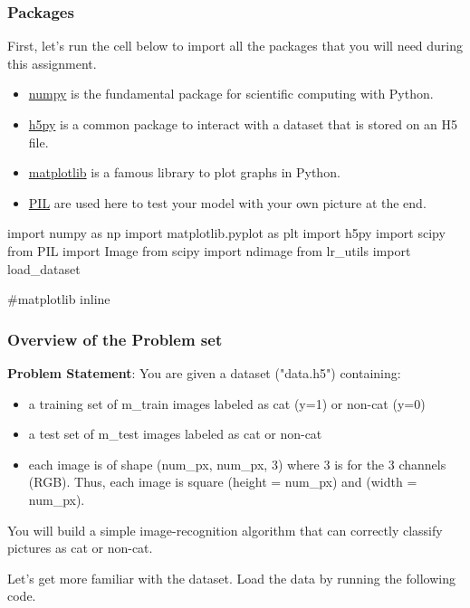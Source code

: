 \subsubsection{Packages}

First, let's run the cell below to import all the packages that you will need during this assignment. 
\begin{itemize}
\item \href{www.numpy.org}{numpy} is the fundamental package for scientific computing with Python.
\item \href{http://www.h5py.org}{h5py} is a common package to interact with a dataset that is stored on an H5 file.
\item \href{http://matplotlib.org}{matplotlib} is a famous library to plot graphs in Python.
\item \href{http://www.pythonware.com/products/pil/}{PIL} are used here to test your model with your own picture at the end.
\end{itemize}

\begin{mypython}
import numpy as np
import matplotlib.pyplot as plt
import h5py
import scipy
from PIL import Image
from scipy import ndimage
from lr_utils import load_dataset

#matplotlib inline
\end{mypython}





\subsubsection{Overview of the Problem set}

{\textbf {Problem Statement}}: You are given a dataset ("data.h5") containing:
\begin{itemize}
\item a training set of m\_train images labeled as cat (y=1) or non-cat (y=0)
\item a test set of m\_test images labeled as cat or non-cat
\item each image is of shape (num\_px, num\_px, 3) where 3 is for the 3 channels (RGB). Thus, each image is square (height = num\_px) and (width = num\_px).
\end{itemize}

You will build a simple image-recognition algorithm that can correctly classify pictures as cat or non-cat.

Let's get more familiar with the dataset. Load the data by running the following code.

